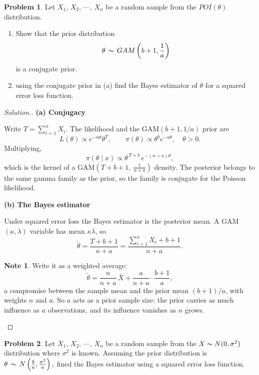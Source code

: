 \documentclass[12pt,a4paper]{report}
\theoremstyle{definition}
\newtheorem*{note}{Note}
\newcommand{\subhead}[1]{%
  \par\medskip\noindent\textbf{#1}\par\nobreak\smallskip}
\newtheorem{problemx}{Problem}[section]
\newenvironment{problem}{\begin{problemx}}{\end{problemx}}
\newenvironment{solution}
  {\renewcommand{\qedsymbol}{}\begin{proof}[\textit{Solution}.]}
  {\end{proof}}
\begin{document}
\begin{problem}
Let  $X_1, \, X_2, \, \cdots\, , \, X_n$ be a random sample from the $POI(\theta)$ distribution.
\begin{enumerate}
\item[(a)] Show that the prior distribution \[\theta \, \thicksim\, GAM\left(b + 1, \frac{1}{a}\right)\] is a conjugate prior.
\item[(b)] using the conjugate prior in (a) find the Bayes estimator of $\theta$ for a squared error loss function.
\end{enumerate}
\end{problem}

\begin{solution}
\subhead{(a) Conjugacy}
Write $T=\sum_{i=1}^{n}X_i$. The likelihood and the GAM$\left(b+1,1/a\right)$
prior are
\[L(\theta) \propto e^{-n\theta}\theta^{T},
\qquad \pi(\theta) \propto \theta^{b}e^{-a\theta},\quad \theta>0 .\]
Multiplying,
\[\pi\left(\theta \mid x\right) \propto \theta^{\,T+b}\,e^{-(n+a)\theta},\]
which is the kernel of a GAM$\left(T+b+1,\ \frac{1}{n+a}\right)$ density. The
posterior belongs to the same gamma family as the prior, so the family is
conjugate for the Poisson likelihood.

\subhead{(b) The Bayes estimator}
Under squared error loss the Bayes estimator is the posterior mean. A
GAM$(\kappa,\lambda)$ variable has mean $\kappa\lambda$, so
\[\widetilde{\theta} = \frac{T+b+1}{n+a}
= \frac{\sum_{i=1}^{n}X_i + b + 1}{n+a} .\]

\begin{note}
Write it as a weighted average:
\[\widetilde{\theta} = \frac{n}{n+a}\,\overline{X} + \frac{a}{n+a}\cdot\frac{b+1}{a},\]
a compromise between the sample mean and the prior mean $(b+1)/a$, with weights
$n$ and $a$. So $a$ acts as a prior sample size: the prior carries as much
influence as $a$ observations, and its influence vanishes as $n$ grows.
\end{note}
\end{solution}

\begin{problem}
Let  $X_1, \, X_2, \, \cdots\, , \, X_n$ be a random sample from the $X\thicksim N(0, \sigma^2)$ distribution where $\sigma^2$ is known. Assuming the prior distribution is $\theta \, \thicksim\, N\left(\frac{b}{a}, \frac{\sigma^2}{a}\right),$ fined the Bayes estimator using a squared error loss function.
\end{problem}
\end{document}

